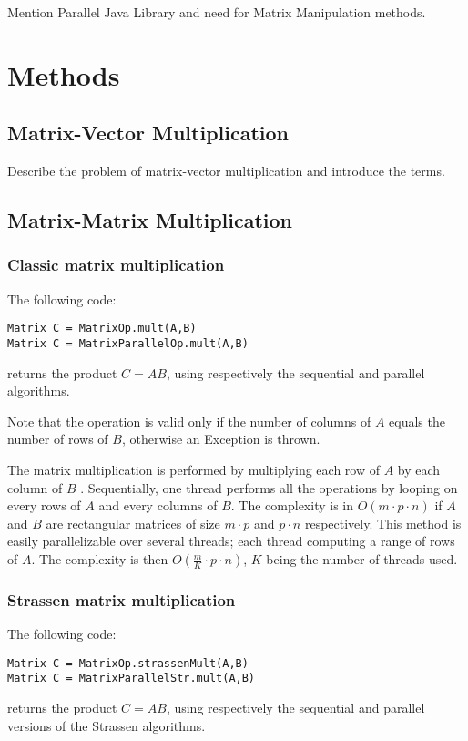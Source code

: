 \documentclass{dependencies/acm_proc_article-sp}
\begin{document}
Mention Parallel Java Library and need for Matrix Manipulation methods.

\section{Methods}
\subsection{Matrix-Vector Multiplication}

Describe the problem of matrix-vector multiplication and introduce the terms.

\subsection{Matrix-Matrix Multiplication}

\subsubsection{Classic matrix multiplication}
The following code:
\begin{verbatim}
Matrix C = MatrixOp.mult(A,B)
Matrix C = MatrixParallelOp.mult(A,B)
\end{verbatim}
returns the product $C=AB$, using respectively the sequential and parallel algorithms.

Note that the operation is valid only if the number of columns of $A$ equals the number of rows of $B$, otherwise an Exception is thrown.

The matrix multiplication is performed by multiplying each row of $A$ by each column of $B$ \cite{MatrixMultiplication}. Sequentially, one thread performs all the operations by looping on every rows of $A$ and every columns of $B$. The complexity is in $O(m\cdot p\cdot n)$ if $A$ and $B$ are rectangular matrices of size $m\cdot p$ and $p\cdot n$ respectively. This method is easily parallelizable over several threads; each thread computing a range of rows of $A$. The complexity is then $O( \frac{m}{K}\cdot p\cdot n )$, $K$ being the number of threads used.

\subsubsection{Strassen matrix multiplication}
The following code:
\begin{verbatim}
Matrix C = MatrixOp.strassenMult(A,B)
Matrix C = MatrixParallelStr.mult(A,B)
\end{verbatim}
returns the product $C=AB$, using respectively the sequential and parallel versions of the Strassen algorithms.
\end{document}

